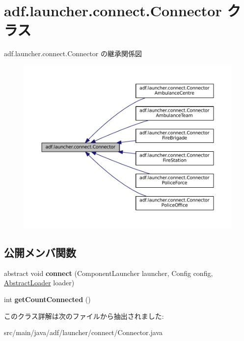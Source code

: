 \hypertarget{classadf_1_1launcher_1_1connect_1_1Connector}{}\section{adf.\+launcher.\+connect.\+Connector クラス}
\label{classadf_1_1launcher_1_1connect_1_1Connector}


adf.\+launcher.\+connect.\+Connector の継承関係図
\nopagebreak
\begin{figure}[H]
\begin{center}
\leavevmode
\includegraphics[width=350pt]{classadf_1_1launcher_1_1connect_1_1Connector__inherit__graph}
\end{center}
\end{figure}
\subsection*{公開メンバ関数}
\begin{DoxyCompactItemize}
\item 
\hypertarget{classadf_1_1launcher_1_1connect_1_1Connector_a0a0ac7fbfd9dd2849165907439b972e5}{}\label{classadf_1_1launcher_1_1connect_1_1Connector_a0a0ac7fbfd9dd2849165907439b972e5} 
abstract void {\bfseries connect} (Component\+Launcher launcher, Config config, \hyperlink{classadf_1_1component_1_1AbstractLoader}{Abstract\+Loader} loader)
\item 
\hypertarget{classadf_1_1launcher_1_1connect_1_1Connector_adb8014f72e8e70fe7eb877b17e7c9f7d}{}\label{classadf_1_1launcher_1_1connect_1_1Connector_adb8014f72e8e70fe7eb877b17e7c9f7d} 
int {\bfseries get\+Count\+Connected} ()
\end{DoxyCompactItemize}


このクラス詳解は次のファイルから抽出されました\+:\begin{DoxyCompactItemize}
\item 
src/main/java/adf/launcher/connect/Connector.\+java\end{DoxyCompactItemize}
